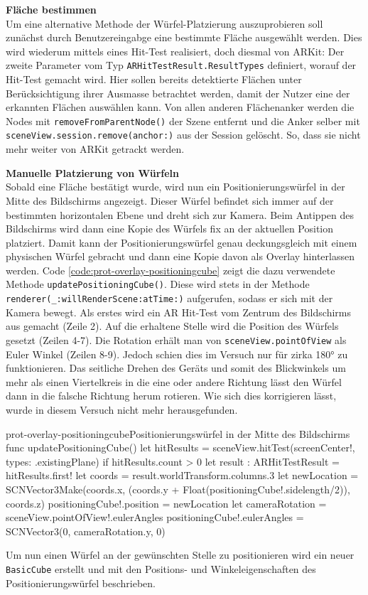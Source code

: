 \begin{description}
	\textbf{Fläche bestimmen}\\
	Um eine alternative Methode der Würfel-Platzierung auszuprobieren soll zunächst durch Benutzereingabge eine bestimmte Fläche ausgewählt werden. Dies wird wiederum mittels eines Hit-Test realisiert, doch diesmal von ARKit:
	Der zweite Parameter vom Typ \texttt{ARHitTestResult.ResultTypes} definiert, worauf der Hit-Test gemacht wird. Hier sollen bereits detektierte Flächen unter Berücksichtigung ihrer Ausmasse betrachtet werden, damit der Nutzer eine der erkannten Flächen auswählen kann. Von allen anderen Flächenanker werden die Nodes mit \texttt{removeFromParentNode()} der Szene entfernt und die Anker selber mit \texttt{sceneView.session.remove(anchor:)} aus der Session gelöscht. So, dass sie nicht mehr weiter von ARKit getrackt werden.

	\textbf{Manuelle Platzierung von Würfeln}\\
	Sobald eine Fläche bestätigt wurde, wird nun ein Positionierungswürfel in der Mitte des Bildschirms angezeigt. Dieser Würfel befindet sich immer auf der bestimmten horizontalen Ebene und dreht sich zur Kamera. Beim Antippen des Bildschirms wird dann eine Kopie des Würfels fix an der aktuellen Position platziert. Damit kann der Positionierungswürfel genau deckungsgleich mit einem physischen Würfel gebracht und dann eine Kopie davon als Overlay hinterlassen werden. Code \ref{code:prot-overlay-positioningcube} zeigt die dazu verwendete Methode \texttt{updatePositioningCube()}. Diese wird stets in der Methode \texttt{renderer(\_:willRenderScene:atTime:)} aufgerufen, sodass er sich mit der Kamera bewegt. Als erstes wird ein AR Hit-Test vom Zentrum des Bildschirms aus gemacht (Zeile 2). Auf die erhaltene Stelle wird die Position des Würfels gesetzt (Zeilen 4-7). Die Rotation erhält man von \texttt{sceneView.pointOfView} als Euler Winkel (Zeilen 8-9). Jedoch schien dies im Versuch nur für zirka 180° zu funktionieren. Das seitliche Drehen des Geräts und somit des Blickwinkels um mehr als einen Viertelkreis in die eine oder andere Richtung lässt den Würfel dann in die falsche Richtung herum rotieren. Wie sich dies korrigieren lässt, wurde in diesem Versuch nicht mehr herausgefunden.

	\begin{code}{prot-overlay-positioningcube}{Positionierungswürfel in der Mitte des Bildschirms}
		func updatePositioningCube() {
			let hitResults = sceneView.hitTest(screenCenter!, types: .existingPlane)
			if hitResults.count > 0 {
				let result : ARHitTestResult = hitResults.first!
				let coords = result.worldTransform.columns.3
				let newLocation = SCNVector3Make(coords.x, (coords.y + Float(positioningCube!.sidelength/2)), coords.z)
				positioningCube!.position = newLocation
				let cameraRotation = sceneView.pointOfView!.eulerAngles
				positioningCube!.eulerAngles = SCNVector3(0, cameraRotation.y, 0)
			}
		}
	\end{code}

	Um nun einen Würfel an der gewünschten Stelle zu positionieren wird ein neuer \texttt{BasicCube} erstellt und mit den Positions- und Winkeleigenschaften des Positionierungswürfel beschrieben.

\end{description}

